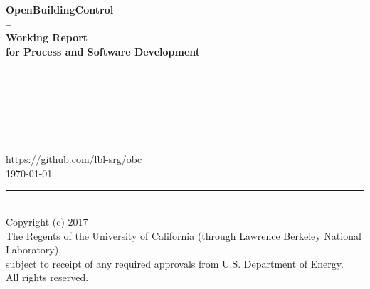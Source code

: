 \begin{titlepage}
\begin{minipage}{\headwidth}
\begin{flushright}
\vspace{-1cm}
\large{~}
\\[5mm]
\hrulefill
\\[5mm]
 \Large\sffamily\bfseries{OpenBuildingControl}\\
 \Large\sffamily\bfseries{--}\\[3mm]
 \Large\sffamily\bfseries{Working Report}\\
 \Large\sffamily\bfseries{for Process and Software Development}
\\
\hrulefill
~\\[30mm]
\end{flushright}
\begin{center}
\large{~}\\
\large{~}\\
\large{~}\\
\large{~}\\
\large{~}\\
\large{https://github.com/lbl-srg/obc}
~\\[30mm]
\large{\today}
\\[50mm]
\end{center}
\hrule
~\\[2mm]
Copyright (c) 2017\\
The Regents of the University of California
(through Lawrence Berkeley National Laboratory),\\
subject to receipt of any required approvals from U.S. Department of Energy.\\
All rights reserved.
\end{minipage}
\end{titlepage}
